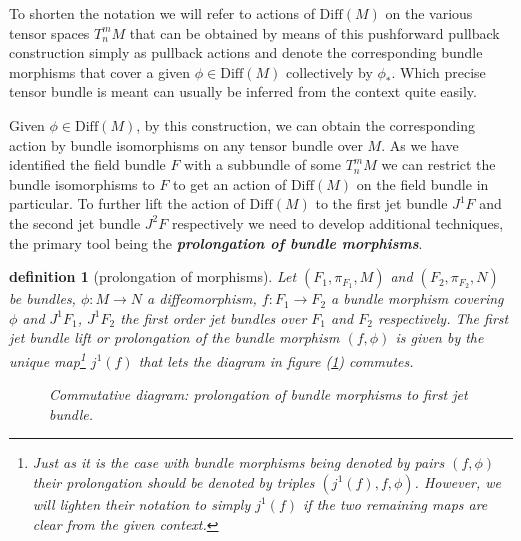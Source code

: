 \documentclass[a4paper,12pt, DIV=14, BCOR=5mm, twoside, headsepline, numbers=noenddot]{scrbook}
\newtheorem{definition}{definition}[section]
\begin{document}
To shorten the notation we will refer to actions of $\mathrm{Diff}(M)$ on the various tensor spaces $T^m_nM$ that can be obtained by means of this pushforward pullback construction simply as pullback actions and denote the corresponding bundle morphisms that cover a given $\phi \in \mathrm{Diff}(M)$ collectively by $\phi_{\ast}$. Which precise tensor bundle is meant can usually be inferred from the context quite easily.

Given $\phi \in \mathrm{Diff}(M)$, by this construction, we can obtain the corresponding action by bundle isomorphisms on any tensor bundle over $M$. As we have identified the field bundle $F$ with a subbundle of some $T^m_nM$ we can restrict the bundle isomorphisms to $F$ to get an action of $\mathrm{Diff}(M)$ on the field bundle in particular. 
To further lift the action of $\mathrm{Diff}(M)$ to the first jet bundle $J^1F$ and the second jet bundle $J^2F$ respectively we need to develop additional techniques, the primary tool being the \textbf{\textit{prolongation of bundle morphisms}}. 
\begin{definition}[prolongation of morphisms]
Let $(F_1,\pi_{F_1},M)$ and $(F_2,\pi_{F_2},N)$ be bundles, $\phi : M \rightarrow N$ a diffeomorphism, $f : F_1 \rightarrow F_2$ a bundle morphism covering $\phi$ and $J^1F_1$, $J^1F_2$ the first order jet bundles over $F_1$ and $F_2$ respectively. The first jet bundle lift or prolongation of the bundle morphism $(f,\phi)$ is given by the unique map\footnote{Just as it is the case with bundle morphisms being denoted by pairs $(f,\phi)$ their prolongation should be denoted by triples $(j^1(f),f,\phi)$. However, we will lighten their notation to simply $j^1(f)$ if the two remaining maps are clear from the given context.} $j^1(f)$ that lets the diagram in figure (\ref{ProlongMorph}) commutes.
\begin{figure}[hbt!]
\centering
{}
\caption{Commutative diagram: prolongation of bundle morphisms to first jet bundle.}\label{ProlongMorph}
\end{figure}
\end{definition}
\end{document}
